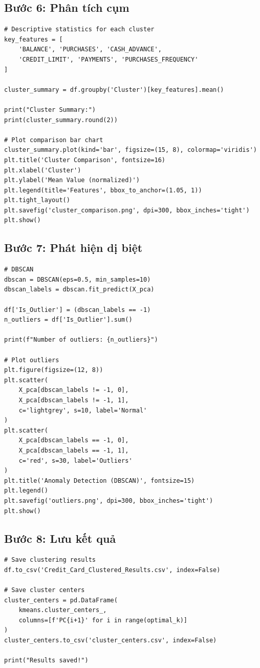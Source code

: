\subsection{Bước 6: Phân tích cụm}

\begin{lstlisting}
# Descriptive statistics for each cluster
key_features = [
    'BALANCE', 'PURCHASES', 'CASH_ADVANCE', 
    'CREDIT_LIMIT', 'PAYMENTS', 'PURCHASES_FREQUENCY'
]

cluster_summary = df.groupby('Cluster')[key_features].mean()

print("Cluster Summary:")
print(cluster_summary.round(2))

# Plot comparison bar chart
cluster_summary.plot(kind='bar', figsize=(15, 8), colormap='viridis')
plt.title('Cluster Comparison', fontsize=16)
plt.xlabel('Cluster')
plt.ylabel('Mean Value (normalized)')
plt.legend(title='Features', bbox_to_anchor=(1.05, 1))
plt.tight_layout()
plt.savefig('cluster_comparison.png', dpi=300, bbox_inches='tight')
plt.show()
\end{lstlisting}

\subsection{Bước 7: Phát hiện dị biệt}

\begin{lstlisting}
# DBSCAN
dbscan = DBSCAN(eps=0.5, min_samples=10)
dbscan_labels = dbscan.fit_predict(X_pca)

df['Is_Outlier'] = (dbscan_labels == -1)
n_outliers = df['Is_Outlier'].sum()

print(f"Number of outliers: {n_outliers}")

# Plot outliers
plt.figure(figsize=(12, 8))
plt.scatter(
    X_pca[dbscan_labels != -1, 0], 
    X_pca[dbscan_labels != -1, 1], 
    c='lightgrey', s=10, label='Normal'
)
plt.scatter(
    X_pca[dbscan_labels == -1, 0], 
    X_pca[dbscan_labels == -1, 1], 
    c='red', s=30, label='Outliers'
)
plt.title('Anomaly Detection (DBSCAN)', fontsize=15)
plt.legend()
plt.savefig('outliers.png', dpi=300, bbox_inches='tight')
plt.show()
\end{lstlisting}

\subsection{Bước 8: Lưu kết quả}

\begin{lstlisting}
# Save clustering results
df.to_csv('Credit_Card_Clustered_Results.csv', index=False)

# Save cluster centers
cluster_centers = pd.DataFrame(
    kmeans.cluster_centers_, 
    columns=[f'PC{i+1}' for i in range(optimal_k)]
)
cluster_centers.to_csv('cluster_centers.csv', index=False)

print("Results saved!")
\end{lstlisting}

